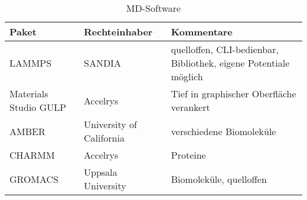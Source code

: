 \begin{table}
  \caption[MD-Software]{MD-Software}
  \label{tab:mdsoftware}
  \begin{tabularx}{\textwidth}{|llX|}
    \hline
    \textbf{Paket} & \textbf{Rechteinhaber} & \textbf{Kommentare} \\
    \hline
    LAMMPS & SANDIA & quelloffen, CLI-bedienbar, Bibliothek, eigene Potentiale möglich \\
    Materials Studio GULP & Accelrys & Tief in graphischer Oberfläche verankert \\
    AMBER & University of California & verschiedene Biomoleküle \\
    CHARMM & Accelrys & Proteine \\
    GROMACS & Uppsala University & Biomoleküle, quelloffen \\
    \hline
  \end{tabularx}
\end{table}

